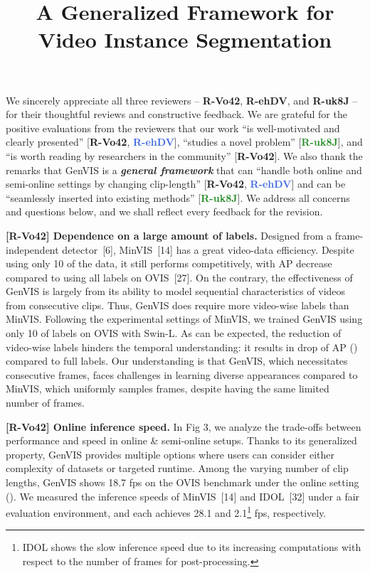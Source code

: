 \documentclass[10pt,twocolumn,letterpaper]{article}
\newcommand{\rone}{{\color{WildStrawberry}\textbf{R-Vo42}}}
\newcommand{\rtwo}{{\color{RoyalBlue}\textbf{R-ehDV}}}
\newcommand{\rthr}{{\color{ForestGreen}\textbf{R-uk8J}}}
\newcommand{\mf}{{\color{green}6}}
\newcommand{\minvis}{{\color{green}14}}
\newcommand{\idol}{{\color{green}32}}
\newcommand{\ovis}{{\color{green}27}}
\newcommand{\rr}{{\textcolor{WildStrawberry}{\textbf{R-Vo42}}}}
\newcommand{\rb}{{\textcolor{RoyalBlue}{\textbf{R-ehDV}}}}
\newcommand{\rg}{{\textcolor{ForestGreen}{\textbf{R-uk8J}}}}
\begin{document}
\title{A Generalized Framework for Video Instance Segmentation}  

\maketitle
\thispagestyle{empty}
\appendix

We sincerely appreciate all three reviewers -- \rone{}, \rtwo{}, and \rthr{} -- for their thoughtful reviews and constructive feedback.
We are grateful for the positive evaluations from the reviewers that our work ``is well-motivated and clearly presented'' [\rr, \rb], ``studies a novel problem'' [\rg], and ``is worth reading by researchers in the community'' [\rr].
We also thank the remarks that GenVIS is a \textbf{\textit{general framework}} that can ``handle both online and semi-online settings by changing clip-length'' [\rr, \rb] and can be ``seamlessly inserted into existing methods'' [\rg].
We address all concerns and questions below, and we shall reflect every feedback for the revision.

\noindent \textbf{[\rr] Dependence on a large amount of labels.}
Designed from a frame-independent detector~[\mf{}], MinVIS~[\minvis{}] has a great video-data efficiency.
Despite using only 10 of the data, it still performs competitively, with  AP decrease compared to using all labels on OVIS~[\ovis{}].
On the contrary, the effectiveness of GenVIS is largely from its ability to model sequential characteristics of videos from consecutive clips.
Thus, GenVIS does require more video-wise labels than MinVIS.
Following the experimental settings of MinVIS, we trained GenVIS using only 10 of labels on OVIS with Swin-L.
As can be expected, the reduction of video-wise labels hinders the temporal understanding: it results in drop of  AP () compared to full labels.
Our understanding is that GenVIS, which necessitates consecutive frames, faces challenges in learning diverse appearances compared to MinVIS, which uniformly samples frames, despite having the same limited number of frames.





\noindent \textbf{[\rr] Online inference speed.}
In Fig {\color{Red}3}, we analyze the trade-offs between performance and speed in online \& semi-online setups.
Thanks to its generalized property, GenVIS provides multiple options where users can consider either complexity of datasets or targeted runtime.
Among the varying number of clip lengths, GenVIS shows 18.7 fps on the OVIS benchmark under the online setting ().
We measured the inference speeds of MinVIS~[\minvis{}] and IDOL~[\idol{}] under a fair evaluation environment, and each achieves 28.1 and 2.1\footnote{IDOL shows the slow inference speed due to its increasing computations with respect to the number of frames for post-processing.} fps, respectively.
\end{document}
